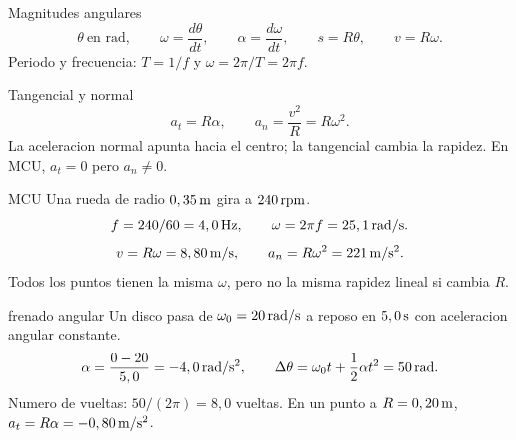 \documentclass[10pt,a4paper]{article}
\begin{document}
\begin{lessoncard}{Magnitudes angulares}
\[
\theta\ \text{en rad},\qquad \omega=\frac{d\theta}{dt},\qquad \alpha=\frac{d\omega}{dt},\qquad
s=R\theta,\qquad v=R\omega.
\]
Periodo y frecuencia: $T=1/f$ y $\omega=2\pi/T=2\pi f$.
\end{lessoncard}

\begin{lessoncard}{Tangencial y normal}
\[
a_t=R\alpha,\qquad a_n=\frac{v^2}{R}=R\omega^2.
\]
La aceleracion normal apunta hacia el centro; la tangencial cambia la rapidez. En MCU, $a_t=0$ pero $a_n\ne0$.
\begin{center}
\end{center}
\end{lessoncard}

\clearpage

\begin{examplebox}{MCU}
Una rueda de radio $0,35\,\mathrm{m}$ gira a $240\,\mathrm{rpm}$.
\solutionblock
\[
f=240/60=4,0\,\mathrm{Hz},\qquad \omega=2\pi f=25,1\,\mathrm{rad/s}.
\]
\[
v=R\omega=8,80\,\mathrm{m/s},\qquad a_n=R\omega^2=221\,\mathrm{m/s^2}.
\]
Todos los puntos tienen la misma $\omega$, pero no la misma rapidez lineal si cambia $R$.
\end{examplebox}

\begin{examplebox}{frenado angular}
Un disco pasa de $\omega_0=20\,\mathrm{rad/s}$ a reposo en $5,0\,\mathrm{s}$ con aceleracion angular constante.
\solutionblock
\[
\alpha=\frac{0-20}{5,0}=-4,0\,\mathrm{rad/s^2},\qquad
\Delta\theta=\omega_0t+\frac12\alpha t^2=50\,\mathrm{rad}.
\]
Numero de vueltas: $50/(2\pi)=8,0$ vueltas. En un punto a $R=0,20\,\mathrm{m}$, $a_t=R\alpha=-0,80\,\mathrm{m/s^2}$.
\end{examplebox}
\end{document}
